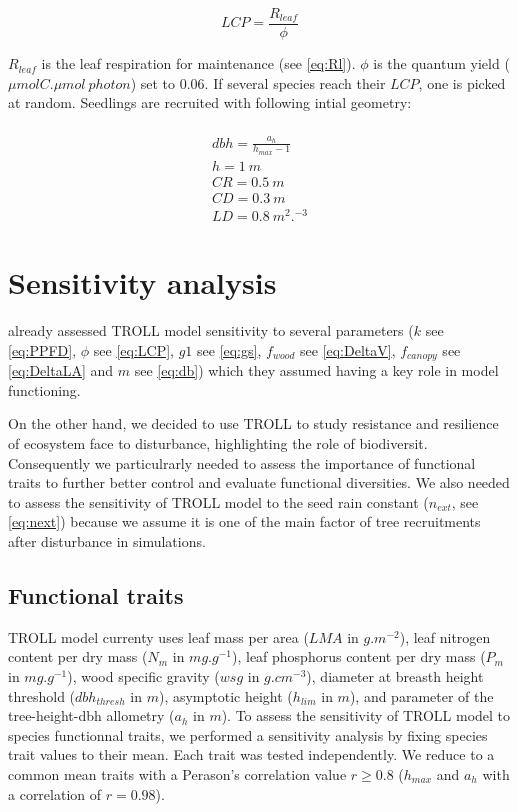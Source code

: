 \documentclass[]{article}
\let\oldsection\section
\renewcommand\section{\newpage\oldsection}
\theoremstyle{definition}
\theoremstyle{definition}
\theoremstyle{remark}
\begin{document}
\begin{equation}
  LCP = \frac{R_{leaf}}{\phi}
  \label{eq:LCP}
\end{equation}

\(R_{leaf}\) is the leaf respiration for maintenance (see \eqref{eq:Rl}).
\(\phi\) is the quantum yield (\(\mu mol C.\mu mol~photon\)) set to
0.06. If several species reach their \(LCP\), one is picked at random.
Seedlings are recruited with following intial geometry:

\begin{equation}
  \begin{array}{c} \\
    dbh = \frac{a_h}{h_{max} - 1}\\
    h = 1~m\\
    CR = 0.5~m\\
    CD = 0.3~m\\
    LD = 0.8~m^2.^{-3}
  \end{array}
  \label{eq:C}
\end{equation}

\section{Sensitivity analysis}\label{sensitivity-analysis}

\citet{Li} already assessed TROLL model sensitivity to several
parameters (\(k\) see \eqref{eq:PPFD}, \(\phi\) see \eqref{eq:LCP}, \(g1\)
see \eqref{eq:gs}, \(f_{wood}\) see \eqref{eq:DeltaV}, \(f_{canopy}\) see
\eqref{eq:DeltaLA} and \(m\) see \eqref{eq:db}) which they assumed having a
key role in model functioning.

On the other hand, we decided to use TROLL to study resistance and
resilience of ecosystem face to disturbance, highlighting the role of
biodiversit. Consequently we particulrarly needed to assess the
importance of functional traits to further better control and evaluate
functional diversities. We also needed to assess the sensitivity of
TROLL model to the seed rain constant (\(n_{ext}\), see \eqref{eq:next})
because we assume it is one of the main factor of tree recruitments
after disturbance in simulations.

\subsection{Functional traits}\label{functional-traits}

TROLL model currenty uses leaf mass per area (\(LMA\) in \(g.m^{-2}\)),
leaf nitrogen content per dry mass (\(N_m\) in \(mg.g^{-1}\)), leaf
phosphorus content per dry mass (\(P_m\) in \(mg.g^{-1}\)), wood
specific gravity (\(wsg\) in \(g.cm^{-3}\)), diameter at breasth height
threshold (\(dbh_{thresh}\) in \(m\)), asymptotic height (\(h_{lim}\) in
\(m\)), and parameter of the tree-height-dbh allometry (\(a_h\) in
\(m\)). To assess the sensitivity of TROLL model to species functionnal
traits, we performed a sensitivity analysis by fixing species trait
values to their mean. Each trait was tested independently. We reduce to
a common mean traits with a Perason's correlation value \(r \geq 0.8\)
(\(h_{max}\) and \(a_h\) with a correlation of \(r=0.98\)).
\end{document}
